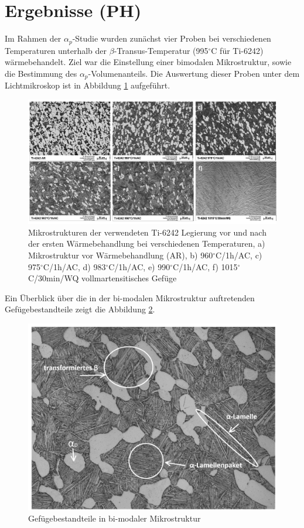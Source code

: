 \section{Ergebnisse (PH)}

Im Rahmen der $\alpha_p$-Studie wurden zunächst vier Proben bei verschiedenen Temperaturen unterhalb der $\beta$-Transus-Temperatur (995$^\circ$C für Ti-6242) wärmebehandelt. Ziel war die Einstellung einer bimodalen Mikrostruktur, sowie die Bestimmung des $\alpha_p$-Volumenanteils. Die Auswertung dieser Proben unter dem Lichtmikroskop ist in Abbildung \ref{fig:abbildung-8} aufgeführt. 

\begin{figure}[h]
	\centering
	\includegraphics[width=1.0\linewidth]{./Bilder/Abbildung 8.png}
	\caption[Abbildung 8]{Mikrostrukturen der verwendeten Ti-6242 Legierung vor und nach der ersten Wärmebehandlung bei verschiedenen Temperaturen, a) Mikrostruktur vor Wärmebehandlung (AR), b) 960$^\circ$C/1h/AC, c) 975$^\circ$C/1h/AC, d) 983$^\circ$C/1h/AC, e) 990$^\circ$C/1h/AC, f) 1015$^\circ$C/30min/WQ vollmartensitisches Gefüge}
	\label{fig:abbildung-8}
\end{figure}

Ein Überblick über die in der bi-modalen Mikrostruktur auftretenden Gefügebestandteile zeigt die Abbildung \ref{fig:abbildung-20}.

\begin{figure}[h]
	\centering
	\includegraphics[width=0.6\linewidth]{./Bilder/Abbildung 20.png}
	\caption[Abbildung 20]{Gefügebestandteile in bi-modaler Mikrostruktur}
	\label{fig:abbildung-20}
\end{figure}

